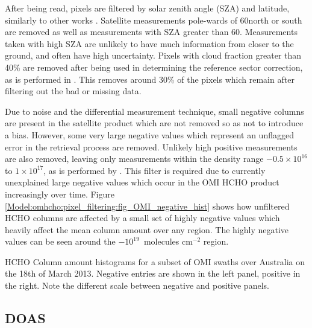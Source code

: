     After being read, pixels are filtered by solar zenith angle (SZA) and latitude, similarly to other works \parencite[e.g.,][]{Marais2012, Barkley2013, Bauwens2016, Zhu2016}.
    Satellite measurements pole-wards of 60\degr north or south are removed as well as measurements with SZA greater than 60\degr.
    Measurements taken with high SZA are unlikely to have much information from closer to the ground, and often have high uncertainty.
    Pixels with cloud fraction greater than 40\% are removed after being used in determining the reference sector correction, as is performed in \textcite{Abad2015, DeSmedt2015}.
    This removes around 30\% of the pixels which remain after filtering out the bad or missing data.

    Due to noise and the differential measurement technique, small negative columns are present in the satellite product which are not removed so as not to introduce a bias.
    However, some very large negative values which represent an unflagged error in the retrieval process are removed.
    Unlikely high positive measurements are also removed, leaving only measurements within the density range $-0.5 \times 10^{16}$ to $1 \times 10^{17} $\moleccm, as is performed by \textcite{Zhu2016}.
    This filter is required due to currently unexplained large negative values which occur in the OMI HCHO product increasingly over time.
    Figure \ref{Model:omhcho:pixel_filtering:fig_OMI_negative_hist} shows how unfiltered HCHO columns are affected by a small set of highly negative values which heavily affect the mean column amount over any region.
    The highly negative values can be seen around the $-10^{19}$~molecules cm$^{-2}$ region.
    
    {
      HCHO Column amount histograms for a subset of OMI swaths over Australia on the 18th of March 2013.
      Negative entries are shown in the left panel, positive in the right.
      Note the different scale between negative and positive panels.
    }{\label{Model:omhcho:pixel_filtering:fig_OMI_negative_hist}}
  
  \subsection{DOAS}
    \label{Model:omhcho:DOAS}
    
